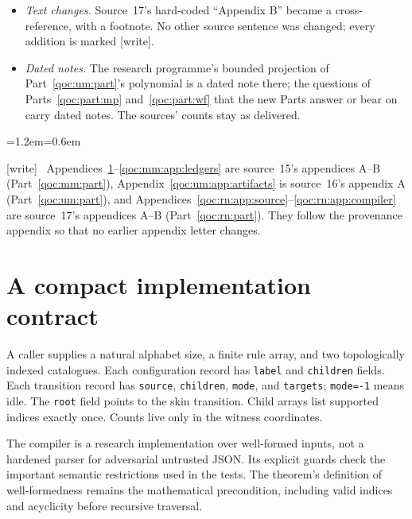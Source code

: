 \documentclass[11pt,letterpaper]{article}
\theoremstyle{definition}
\theoremstyle{remark}
\newcommand{\file}[1]{\nolinkurl{#1}}
\newcommand{\wtag}{\textup{[write]}}
\newenvironment{writenote}{\par\smallskip\begin{list}{}{\leftmargin=1.2em\rightmargin=0.6em}\item[]\small\wtag\ }{\end{list}\smallskip}
\begin{document}
\begin{itemize}
\item \emph{Text changes.} Source~17's hard-coded ``Appendix B'' became a cross-reference, with a footnote. No other source sentence was changed; every addition is marked \wtag.
\item \emph{Dated notes.} The research programme's bounded projection of Part~\ref{qoc:um:part}'s polynomial is a dated note there; the questions of Parts~\ref{qoc:part:mp} and~\ref{qoc:part:wf} that the new Parts answer or bear on carry dated notes. The sources' counts stay as delivered.
\end{itemize}

\begin{writenote}
Appendices~\ref{qoc:mm:app:contract}--\ref{qoc:mm:app:ledgers} are source~15's appendices A--B (Part~\ref{qoc:mm:part}), Appendix~\ref{qoc:um:app:artifacts} is source~16's appendix A (Part~\ref{qoc:um:part}), and Appendices~\ref{qoc:rn:app:source}--\ref{qoc:rn:app:compiler} are source~17's appendices A--B (Part~\ref{qoc:rn:part}). They follow the provenance appendix so that no earlier appendix letter changes.
\end{writenote}

\section{A compact implementation contract}\label{qoc:mm:app:contract}
A caller supplies a natural alphabet size, a finite rule array, and two topologically indexed catalogues. Each configuration record has \file{label} and \file{children} fields. Each transition record has \file{source}, \file{children}, \file{mode}, and \file{targets}; \file{mode=-1} means idle. The \file{root} field points to the skin transition. Child arrays list supported indices exactly once. Counts live only in the witness coordinates.

The compiler is a research implementation over well-formed inputs, not a hardened parser for adversarial untrusted JSON. Its explicit guards check the important semantic restrictions used in the tests. The theorem's definition of well-formedness remains the mathematical precondition, including valid indices and acyclicity before recursive traversal.
\end{document}
